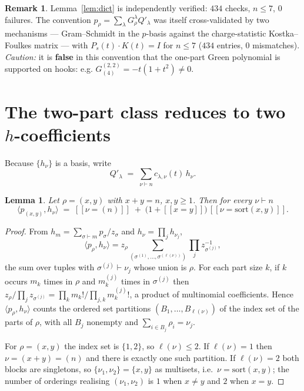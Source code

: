 \documentclass[11pt]{article}
\theoremstyle{plain}
\newtheorem{lemma}[theorem]{Lemma}
\theoremstyle{definition}
\newtheorem{remark}[theorem]{Remark}
\newcommand{\Qp}{Q'}
\newcommand{\lam}{\lambda}
\newcommand{\lb}{[\![}
\newcommand{\rb}{]\!]}
\begin{document}
\begin{remark}
Lemma~\ref{lem:dict} is independently verified: $434$ checks, $n\le 7$, $0$ failures. The
convention $p_\rho=\sum_\lam G^\lam_\rho\Qp_\lam$ was itself cross-validated by two mechanisms
--- Gram--Schmidt in the $p$-basis against the charge-statistic Kostka--Foulkes matrix --- with
$P_s(t)\cdot K(t)=I$ for $n\le 7$ ($434$ entries, $0$ mismatches). \emph{Caution:} it is
\textbf{false} in this convention that the one-part Green polynomial is supported on hooks: e.g.
$G^{(2,2)}_{(4)}=-t(1+t^2)\neq 0$.
\end{remark}

\section{The two-part class reduces to two $h$-coefficients}

Because $\{h_\nu\}$ is a basis, write
\begin{equation}\label{eq:hexp}
  \Qp_\lam \;=\; \sum_{\nu\vdash n} c_{\lam,\nu}(t)\, h_\nu .
\end{equation}

\begin{lemma}\label{lem:ph}
Let $\rho=(x,y)$ with $x+y=n$, $x,y\ge 1$. Then for every $\nu\vdash n$
\[
  \langle p_{(x,y)},h_\nu\rangle \;=\; \lb \nu=(n)\rb \;+\;\bigl(1+\lb x=y\rb\bigr)\,
  \lb \nu=\mathrm{sort}(x,y)\rb .
\]
\end{lemma}

\begin{proof}
From $h_m=\sum_{\sigma\vdash m}p_\sigma/z_\sigma$ and $h_\nu=\prod_j h_{\nu_j}$,
\[
  \langle p_\rho,h_\nu\rangle=z_\rho\!\!\sum_{(\sigma^{(1)},\dots,\sigma^{(\ell(\nu))})}
  \prod_j z_{\sigma^{(j)}}^{-1},
\]
the sum over tuples with $\sigma^{(j)}\vdash\nu_j$ whose union is $\rho$. For each part size $k$,
if $k$ occurs $m_k$ times in $\rho$ and $m_k^{(j)}$ times in $\sigma^{(j)}$ then
$z_\rho/\prod_j z_{\sigma^{(j)}}=\prod_k m_k!\big/\prod_{j,k}m_k^{(j)}!$, a product of
multinomial coefficients. Hence $\langle p_\rho,h_\nu\rangle$ counts the ordered set partitions
$(B_1,\dots,B_{\ell(\nu)})$ of the index set of the parts of $\rho$, with all $B_j$ nonempty and
$\sum_{i\in B_j}\rho_i=\nu_j$.

For $\rho=(x,y)$ the index set is $\{1,2\}$, so $\ell(\nu)\le 2$. If $\ell(\nu)=1$ then
$\nu=(x+y)=(n)$ and there is exactly one such partition. If $\ell(\nu)=2$ both blocks are
singletons, so $\{\nu_1,\nu_2\}=\{x,y\}$ as multisets, i.e.\ $\nu=\mathrm{sort}(x,y)$; the number
of orderings realising $(\nu_1,\nu_2)$ is $1$ when $x\ne y$ and $2$ when $x=y$.
\end{proof}
\end{document}
